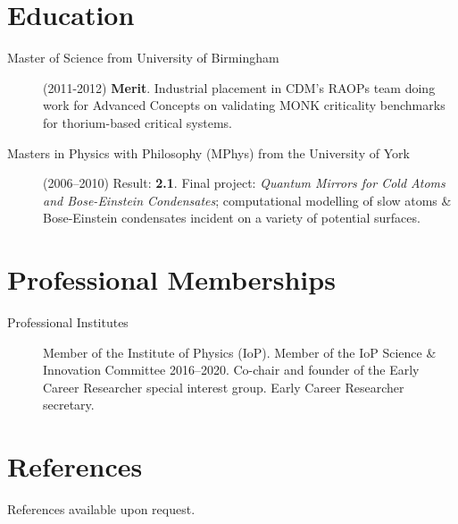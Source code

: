 \documentclass[margin,line]{resume}
\begin{document}
\begin{resume}
\begin{description}
	\end{description}


	\section{\mysidestyle Education}\vspace{1mm}

	\begin{description}

		\item[Master of Science from University of Birmingham] (2011-2012)
		      \textbf{Merit}. Industrial placement in \textsc{CDM}'s \textsc{RAOP}s
		      team doing work for Advanced Concepts on validating MONK criticality
		      benchmarks for thorium-based critical systems.

		\item[Masters in Physics with Philosophy (MPhys) from the University of York]
		      (2006--2010) \linebreak Result: \textbf{2.1}. Final project:
		      \textit{Quantum Mirrors for Cold Atoms and Bose-Einstein
			      Condensates}; computational modelling of slow atoms \& Bose-Einstein
		      condensates incident on a variety of potential surfaces.

	\end{description}

	\section{\mysidestyle Professional Memberships}\vspace{1mm}

	\begin{description}

		\item[Professional Institutes] Member of the Institute of Physics
		      (IoP).  Member of the IoP Science \& Innovation Committee
		      2016--2020. Co-chair and founder of the Early Career Researcher
		      special interest group. Early Career Researcher secretary.

	\end{description}

	\section{\mysidestyle References}\vspace{1mm}

	\begin{description}

		\item References available upon request.

	\end{description}

\end{resume}
\end{document}
